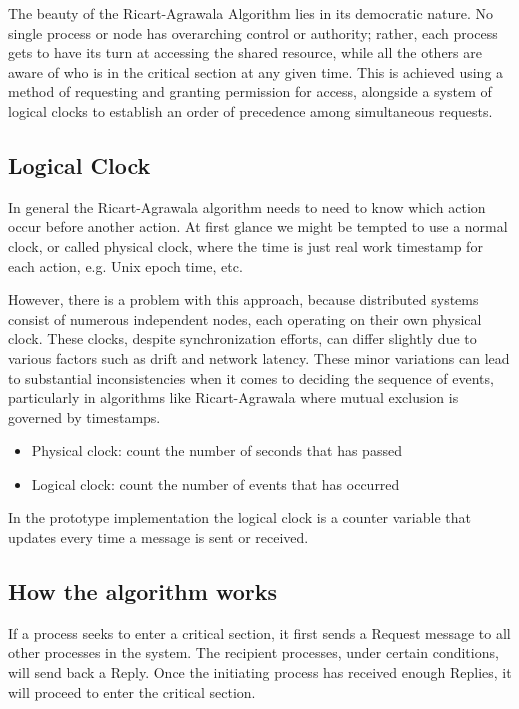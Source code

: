The beauty of the Ricart-Agrawala Algorithm lies in its democratic nature. No 
single process or node has overarching control or authority; rather, each process 
gets to have its turn at accessing the shared resource, while all the others are 
aware of who is in the critical section at any given time. This is achieved using 
a method of requesting and granting permission for access, alongside a system of 
logical clocks to establish an order of precedence among simultaneous requests.

\subsection{Logical Clock}
In general the Ricart-Agrawala algorithm needs to need to know which action occur 
before another action. At first glance we might be tempted to use a normal clock, 
or called physical clock, where the time is just real work timestamp for each action, 
e.g. Unix epoch time, etc.

However, there is a problem with this approach, because 
distributed systems consist of numerous independent nodes, each operating on their 
own physical clock. These clocks, despite synchronization efforts, can differ 
slightly due to various factors such as drift and network latency. These minor 
variations can lead to substantial inconsistencies when it comes to deciding the 
sequence of events, particularly in algorithms like Ricart-Agrawala where mutual 
exclusion is governed by timestamps.


\begin{itemize}
  \item Physical clock: count the number of seconds that has passed
  \item Logical clock: count the number of events that has occurred
\end{itemize}

In the prototype implementation the logical clock is a counter variable that updates
every time a message is sent or received.
\subsection{How the algorithm works}

If a process seeks to enter a critical section, it first sends a Request message to all other processes in the system. The recipient processes, under certain conditions, will send back a Reply. Once the initiating process has received enough Replies, it will proceed to enter the critical section.

